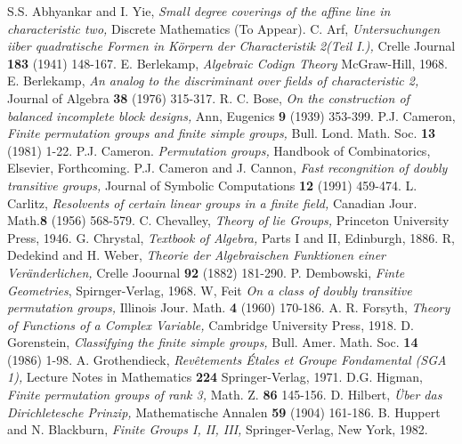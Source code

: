\begin{thebibliography}{99}
 S.S. Abhyankar and I. Yie, \textit{Small degree coverings of the affine line in characteristic two,} Discrete Mathematics (To Appear).
 C. Arf, \textit{Untersuchungen iiber quadratische Formen in K\"orpern der Characteristik 2(Teil I.),} Crelle Journal {\bf 183} (1941) 148-167. 
 E. Berlekamp, \textit{Algebraic Codign Theory} McGraw-Hill, 1968.
 E. Berlekamp, \textit{An analog to the discriminant over fields of characteristic 2,} Journal of Algebra {\bf 38} (1976) 315-317.
 R. C. Bose, \textit{On the construction of balanced incomplete block designs,} Ann, Eugenics {\bf 9} (1939) 353-399.
 P.J. Cameron, \textit{Finite permutation groups and finite simple groups,} Bull. Lond. Math. Soc. {\bf 13} (1981) 1-22.
 P.J. Cameron. \textit{Permutation groups,} Handbook of Combinatorics, Elsevier, Forthcoming.
 P.J. Cameron and J. Cannon, \textit{Fast recongnition of doubly transitive groups,} Journal of Symbolic Computations {\bf 12} (1991) 459-474.
 L. Carlitz, \textit{Resolvents of certain linear groups in a finite field,} Canadian Jour. Math.{\bf 8} (1956) 568-579.
 C. Chevalley, \textit{Theory of lie Groups,} Princeton University Press, 1946.  
 G. Chrystal, \textit{Textbook of Algebra,} Parts I and II, Edinburgh, 1886.
 R, Dedekind and H. Weber, \textit{Theorie der Algebraischen Funktionen einer Ver\"anderlichen,} Crelle Joournal {\bf 92} (1882) 181-290.
 P. Dembowski, \textit{Finte Geometries}, Spirnger-Verlag, 1968.
 W, Feit \textit{On a class of doubly transitive permutation groups,} Illinois Jour. Math. {\bf 4} (1960) 170-186.
 A. R. Forsyth, \textit{Theory of Functions of a Complex Variable,} Cambridge University Press, 1918.
 D. Gorenstein, \textit{Classifying the finite simple groups,} Bull. Amer. Math. Soc. {\bf 14} (1986) 1-98.
 A. Grothendieck, \textit{Rev\^etements \'Etales et Groupe Fondamental (SGA 1),} Lecture Notes in Mathematics {\bf 224} Springer-Verlag, 1971.
 D.G. Higman, \textit{Finite permutation groups of rank 3,} Math. Z. {\bf 86} 145-156.
 D. Hilbert, \textit{\"Uber das Dirichletesche Prinzip,} Mathematische Annalen {\bf 59} (1904) 161-186.
 B. Huppert and N. Blackburn, \textit{Finite Groups I, II, III,} Springer-Verlag, New York, 1982.

\end{thebibliography}

